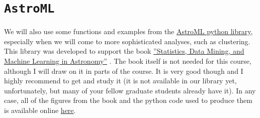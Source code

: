 \section{{\tt AstroML}}

We will also use some functions and examples from the \href{https://pypi.python.org/pypi/astroML/}{AstroML python library}, especially when we will come to more sophisticated analyses, such as clustering. This library was developed to support the book \href{http://press.princeton.edu/titles/10159.html}{''Statistics, Data Mining, and Machine Learning in Astronomy''} \citep{ivezic_etal13}. The book itself is not needed for this course, although I will draw on it in parts of the course. It is very good though and I highly recommend to get and study it (it is not available in our library yet, unfortunately, but many of your fellow graduate students already have it). In any case, all of the figures from the book and the python code used to produce them is available online \href{http://www.astroml.org/book_figures/index.html}{here}. 
